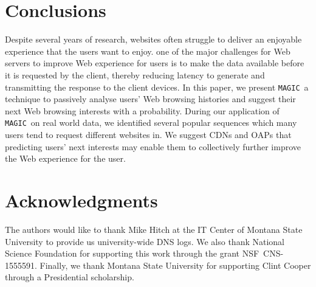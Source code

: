 \documentclass[letterpaper,twocolumn]{article}
\newcommand{\sol}{\texttt{MAGIC}}
\begin{document}
\vspace{-12pt}
\section{Conclusions}
\label{sec:conclusion}
\vspace{-10pt}

Despite several years of research, websites often struggle to deliver an enjoyable experience that the users want to enjoy.
one of the major challenges for Web servers to improve Web experience for users is to make the data available before it is requested by the client, thereby reducing latency to generate and transmitting the response to the client devices.
In this paper, we present \sol\, a technique to passively analyse users' Web browsing histories and suggest their next Web browsing interests with a probability.
During our application of \sol\ on real world data, we identified several popular sequences which many users tend to request different websites in.
We suggest CDNs and OAPs that predicting users' next interests may enable them to collectively further improve the Web experience for the user.




\vspace{-10pt}
\section*{Acknowledgments}
\vspace{-8pt}
The authors would like to thank Mike Hitch at the IT Center of Montana State University to provide us university-wide DNS logs.
We also thank \mbox{National} \mbox{Science} \mbox{Foundation} for supporting this work through the grant \mbox{NSF CNS-1555591}.
Finally, we thank Montana State University for supporting Clint Cooper through a Presidential scholarship.


\vspace{-11pt}

 
\end{document}

